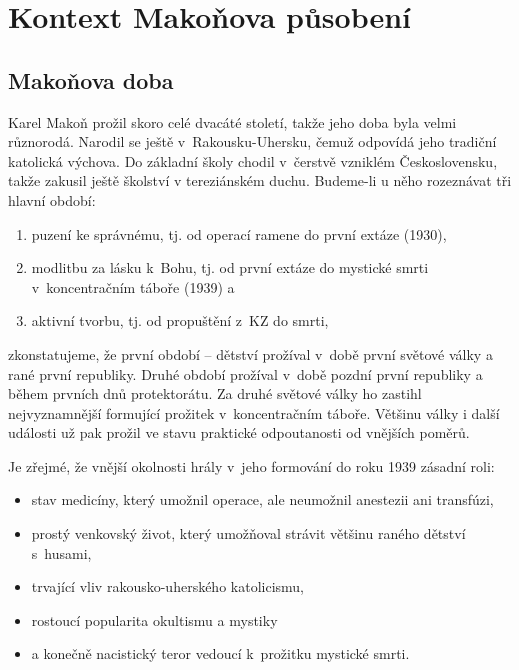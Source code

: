 \chapter{Kontext Makoňova působení}

\section{Makoňova doba}

Karel Makoň prožil skoro celé dvacáté století, takže jeho doba byla velmi
různorodá. Narodil se ještě v~Rakousku-Uhersku, čemuž odpovídá jeho tradiční
katolická výchova. Do základní školy chodil v~čerstvě vzniklém
Československu, takže zakusil ještě školství v tereziánském duchu. Budeme-li u
něho rozeznávat tři hlavní období:
\begin{enumerate}
\item{puzení ke správnému, tj. od operací ramene do první extáze (1930),}
\item{modlitbu za lásku k~Bohu, tj. od první extáze do mystické smrti
v~koncentračním táboře (1939) a}
\item{aktivní tvorbu, tj. od propuštění z~KZ do smrti,}
\end{enumerate}
zkonstatujeme, že první období -- dětství prožíval v~době první světové války a
rané první republiky. Druhé období prožíval v~době pozdní první republiky a
během prvních dnů protektorátu. Za druhé světové války ho zastihl nejvyznamnější
formující prožitek v~koncentračním táboře. Většinu války i další události už pak
prožil ve stavu praktické odpoutanosti od vnějších poměrů.

Je zřejmé, že vnější okolnosti hrály v~jeho formování do roku 1939 zásadní roli:
\begin{itemize}
\item{stav medicíny, který umožnil operace, ale neumožnil anestezii ani
transfúzi,}
\item{prostý venkovský život, který umožňoval strávit většinu raného dětství
s~husami,}
\item{trvající vliv rakousko-uherského katolicismu,}
\item{rostoucí popularita okultismu a mystiky}
\item{a konečně nacistický teror vedoucí k~prožitku mystické smrti.}
\end{itemize}

